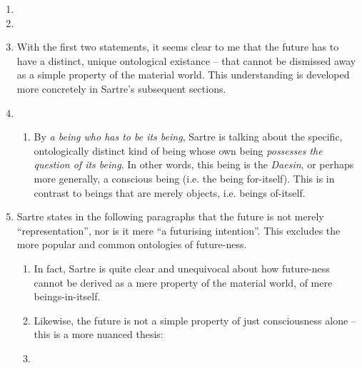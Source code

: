 \begin{enumerate}
  \item {}
  \item {}
  \item With the first two statements, it seems clear to me that the future has to have a distinct, unique ontological existance -- that cannot be dismissed away as a simple property of the material world. This understanding is developed more concretely in Sartre's subsequent sections.
  \item {}
  \begin{enumerate}
    \item By \emph{a being who has to be its being}, Sartre is talking about the specific, ontologically distinct kind of being whose own being \emph{possesses the question of its being}. In other words, this being is the \emph{Daesin}, or perhaps more generally, a conscious being (i.e. the being for-itself). This is in contrast to beings that are merely objects, i.e. beings of-itself.
  \end{enumerate}
  \item Sartre states in the following paragraphs that the future is not merely \enquote{representation}, nor is it mere \enquote{a futurising intention}. This excludes the more popular and common ontologies of future-ness.
  \begin{enumerate}
    \item In fact, Sartre is quite clear and unequivocal about how future-ness cannot be derived as a mere property of the material world, of mere beings-in-itself.
    \item Likewise, the future is not a simple property of just consciousness alone -- this is a more nuanced thesis:
    \item {}

\end{enumerate}
\end{enumerate}
